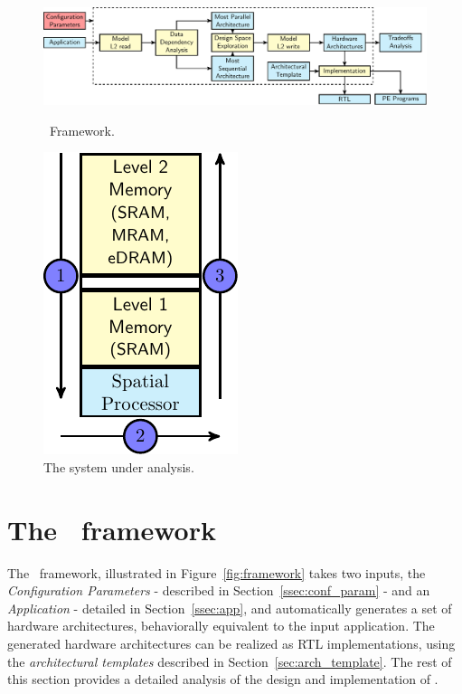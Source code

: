 \begin{figure}[!ht]
\begin{minipage}{.7\textwidth}
\includegraphics[width=\textwidth,left]{images/framework_v2.pdf}
  \caption{\small \frameworkname~Framework.}{}
  \label{fig:framework}
\end{minipage}%
\begin{minipage}{.3\textwidth}
    \centering
\includegraphics[width=.4\textwidth]{images/architecture_v2.pdf}
\caption{\small The system under analysis.
    }
\label{fig:system}
\end{minipage}
\squeezeup
\squeezeup
\end{figure}
\section{The \frameworkname~framework}
\label{sec:framework}
The \frameworkname~framework, illustrated in Figure~\ref{fig:framework} takes two inputs, the \textit{Configuration Parameters} - described in Section~\ref{ssec:conf_param} - and an \textit{Application} - detailed in Section~\ref{ssec:app}, and automatically generates a set of hardware architectures, behaviorally equivalent to the input application.
The generated hardware architectures can be realized as RTL implementations, using the \textit{architectural templates} described in Section~\ref{sec:arch_template}.
The rest of this section provides a detailed analysis of the design and implementation of \frameworkname.

